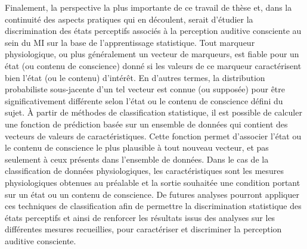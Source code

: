 Finalement, la perspective la plus importante de ce travail de thèse et, dans la continuité des aspects pratiques qui en découlent, serait d'étudier la discrimination des états perceptifs associés à la perception auditive consciente au sein du MI sur la base de l'apprentissage statistique. 
Tout marqueur physiologique, ou plus généralement un vecteur de marqueurs, est fiable pour un état (ou contenu de conscience) donné si les valeurs de ce marqueur caractérisent bien l'état (ou le contenu) d'intérêt. 
En d'autres termes, la distribution probabiliste sous-jacente d'un tel vecteur est connue (ou supposée) pour être significativement différente selon l'état ou le contenu de conscience défini du sujet. 
À partir de méthodes de classification statistique, il est possible de calculer une fonction de prédiction basée sur un ensemble de données qui contient des vecteurs de valeurs de caractéristiques.
Cette fonction permet d'associer l'état ou le contenu de conscience le plus plausible à tout nouveau vecteur, et pas seulement à ceux présents dans l'ensemble de données.
Dans le cas de la classification de données physiologiques, les caractéristiques sont les mesures physiologiques obtenues au préalable et la sortie souhaitée une condition portant sur un état ou un contenu de conscience. 
De futures analyses pourront appliquer ces techniques de classification afin de permettre la discrimination statistique des états perceptifs et ainsi de renforcer les résultats issus des analyses sur les différentes mesures recueillies, pour caractériser et discriminer la perception auditive consciente. 

\clearpage\null\newpage
